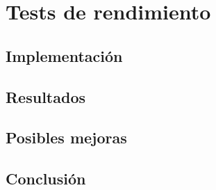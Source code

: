 \chapter{Tests de rendimiento}

\section{Implementación}
\section{Resultados}
\section{Posibles mejoras}
\section{Conclusión}